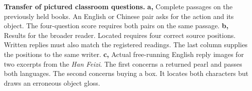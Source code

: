 \textbf{Transfer of pictured classroom questions.}
\textbf{a,} Complete passages on the previously held books. An English or Chinese pair asks for the action and its object. The four-question score requires both pairs on the same passage. \textbf{b,} Results for the broader reader. Located requires four correct source positions. Written replies must also match the registered readings. The last column supplies the positions to the same writer. \textbf{c,} Actual free-running English reply images for two excerpts from the \textit{Han Feizi}. The first concerns a returned pearl and passes both languages. The second concerns buying a box. It locates both characters but draws an erroneous object gloss.
